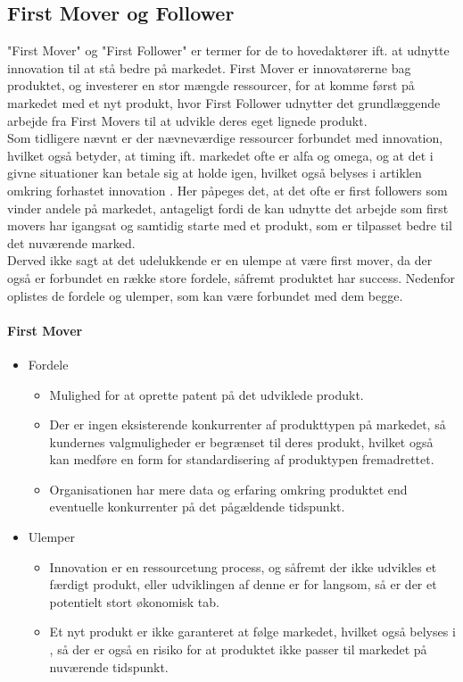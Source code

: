 \subsection{First Mover og Follower}
"First Mover" og "First Follower" er termer for de to hovedaktører ift. at udnytte innovation til at stå bedre på markedet.
First Mover er innovatørerne bag produktet, og investerer en stor mængde ressourcer, for at komme først på markedet med et nyt produkt, hvor First Follower udnytter det grundlæggende arbejde fra First Movers til at udvikle deres eget lignede produkt.
\\Som tidligere nævnt er der nævneværdige ressourcer forbundet med innovation, hvilket
også betyder, at timing ift. markedet ofte er alfa og omega, og at det i givne situationer kan betale sig at holde igen, hvilket også belyses i artiklen omkring forhastet innovation \cite[a.1]{eksamensopgave}.
Her påpeges det, at det ofte er first followers som vinder andele på markedet, antageligt fordi de kan udnytte det arbejde som first movers har igangsat og samtidig starte med et produkt, som er tilpasset bedre til det nuværende marked.\\
Derved ikke sagt at det udelukkende er en ulempe at være first mover, da der også er forbundet en række store fordele, såfremt produktet har success. Nedenfor oplistes de fordele og ulemper, som kan være forbundet med dem begge.
\paragraph{First Mover}
\begin{itemize}
    \item Fordele
    \begin{itemize}
        \item Mulighed for at oprette patent på det udviklede produkt.
        \item Der er ingen eksisterende konkurrenter af produkttypen på markedet, så kundernes valgmuligheder er begrænset til deres produkt, hvilket også kan medføre en form for standardisering af produktypen fremadrettet.
        \item Organisationen har mere data og erfaring omkring produktet end eventuelle konkurrenter på det pågældende tidspunkt.
    \end{itemize}
    \item Ulemper
    \begin{itemize}
        \item Innovation er en ressourcetung process, og såfremt der ikke udvikles et færdigt produkt, eller udviklingen af denne er for langsom, så er der et potentielt stort økonomisk tab.
        \item Et nyt produkt er ikke garanteret at følge markedet, hvilket også belyses i \cite[a.1]{eksamensopgave}, så der er også en risiko for at produktet ikke passer til markedet på nuværende tidspunkt.
    \end{itemize}
\end{itemize}
